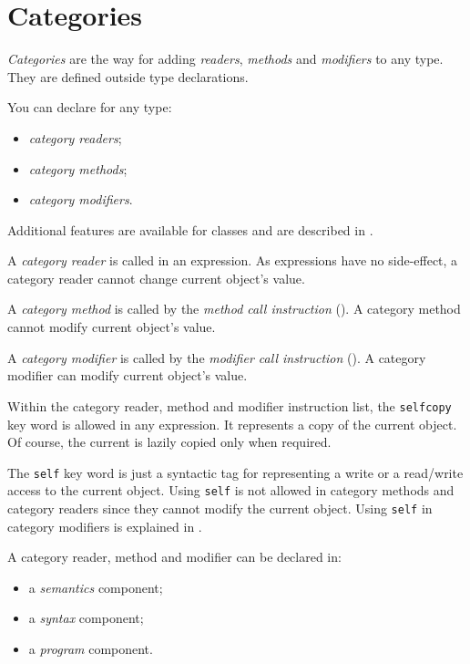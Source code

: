
\chapter{Categories}

\emph{Categories} are the way for adding \emph{readers}, \emph{methods} and \emph{modifiers} to any type. They are defined outside type declarations.

You can declare for any type:
\begin{itemize}
\item \emph{category readers};
\item \emph{category methods};
\item \emph{category modifiers}.
\end{itemize}

Additional features are available for classes and are described in .


A \emph{category reader} is called in an expression. As expressions have no side-effect, a category reader cannot change current object's value.

A \emph{category method} is called by the \emph{method call instruction} (). A category method cannot modify current object's value.

A \emph{category modifier} is called by the \emph{modifier call instruction} (). A category modifier can modify current object's value.

Within the category reader, method and modifier instruction list, the \lstinline[language=galgas]!selfcopy! key word is allowed in any expression. It represents a copy of the current object. Of course, the current is lazily copied only when required.

The \lstinline[language=galgas]!self! key word is just a syntactic tag for representing a write or a read/write access to the current object. Using \lstinline[language=galgas]!self! is not allowed in category methods and category readers since they cannot modify the current object. Using \lstinline[language=galgas]!self! in category modifiers is explained in . 


A category reader, method and modifier can be declared in:
\begin{itemize}
\item a \emph{semantics} component;
\item a \emph{syntax} component;
\item a \emph{program} component.
\end{itemize}

